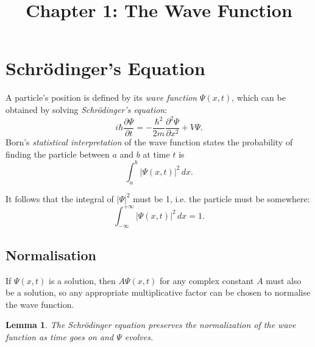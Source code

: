 \documentclass{article}
\newtheorem*{lemma*}{Lemma}
\begin{document}
\title{Chapter 1: The Wave Function}
\maketitle

\section{Schr\"{o}dinger's Equation}

A particle's position is defined by its \emph{wave function} $\Psi(x, t)$,
which can be obtained by solving \emph{Schr\"{o}dinger's equation}:
\begin{equation}
  i\hbar\frac{\partial \Psi}{\partial t} = -\frac{\hbar^2}{2m}
  \frac{\partial^2 \Psi}{\partial x^2} + V\Psi. \label{eq:sch-eqn}
\end{equation} Born's \emph{statistical interpretation} of the wave function
states the probability of finding the particle between $a$ and $b$ at time $t$
is \begin{equation*}
  \int_a^b |\Psi(x, t)|^2 \,dx.
\end{equation*}

It follows that the integral of $|\Psi|^2$ must be 1, i.e. the particle must be
somewhere: \begin{equation}
  \int_{-\infty}^{+\infty} |\Psi(x, t)|^2 \,dx = 1.
\end{equation}

\subsection{Normalisation}

If $\Psi(x, t)$ is a solution, then $A\Psi(x, t)$ for any complex constant $A$
must also be a solution, so any appropriate multiplicative factor can be chosen
to normalise the wave function.

\begin{lemma*}
  The Schr\"{o}dinger equation preserves the normalization of the wave function
  as time goes on and $\Psi$ evolves.
\end{lemma*}
\end{document}
